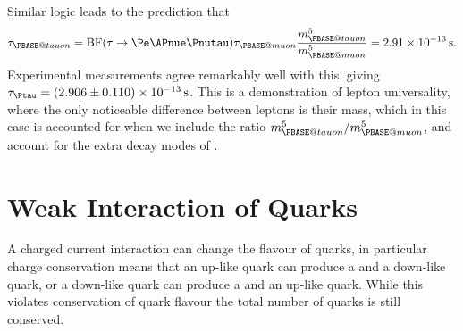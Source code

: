 \documentclass[fleqn]{NotesClass}
\makeatletter
\newcommand{\Pmuonneutral}{\ensuremath{\PBASE@muon}}
\newcommand{\Ptauneutral}{\ensuremath{\PBASE@tauon}}
\newcommand*{\branchingfraction}{\mathrm{BF}}
\makeatother
\begin{document}
    Similar logic leads to the prediction that 
    \begin{equation}
        \tau_{\Ptauneutral} = \branchingfraction(\tau \to \Pe\APnue\Pnutau) \tau_{\Pmuonneutral} \frac{m_{\Ptauneutral}^5}{m_{\Pmuonneutral}^5} = \qty{2.91e-13}{\second}.
    \end{equation}
    Experimental measurements agree remarkably well with this, giving \(\tau_{\Ptau} = \qty[uncertainty-mode=separate]{2.906+-0.11e-13}{\second}\).
    This is a demonstration of lepton universality, where the only noticeable difference between leptons is their mass, which in this case is accounted for when we include the ratio \(m_{\Ptauneutral}^5/m_{\Pmuonneutral}^5\), and account for the extra decay modes of \Ptau.
    
    \section{Weak Interaction of Quarks}
    A charged current interaction can change the flavour of quarks, in particular charge conservation means that an up-like quark can produce a \PWp{} and a down-like quark, or a down-like quark can produce a \PWm{} and an up-like quark.
    While this violates conservation of quark flavour the total number of quarks is still conserved.
    
\end{document}
